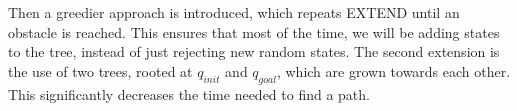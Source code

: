 \documentclass[10pt, conference, compsoc]{IEEEtran}
\begin{document}
Then a
greedier approach is introduced,
which repeats EXTEND until
an obstacle is reached. This ensures that most of the time, we
will be adding states to the tree, instead of just rejecting new random states.
The second extension is the use of two trees, rooted at $q_{init}$ and
$q_{goal}$, which are grown towards each other. This significantly decreases the
time needed to find a path.



\end{document}
